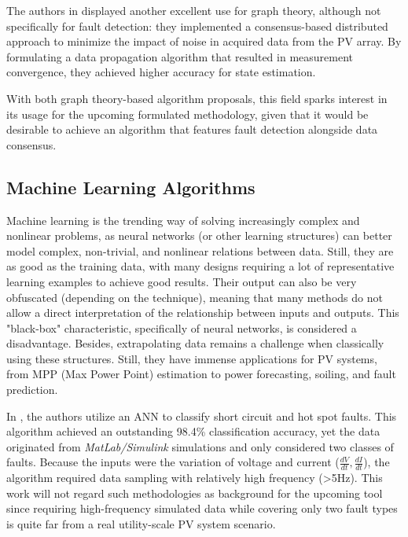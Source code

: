 The authors in \cite{Katoch2018} displayed another excellent use for graph theory, although not specifically for fault detection: they implemented a consensus-based distributed approach to minimize the impact of noise in acquired data from the PV array. By formulating a data propagation algorithm that resulted in measurement convergence, they achieved higher accuracy for state estimation.

With both graph theory-based algorithm proposals, this field sparks interest in its usage for the upcoming formulated methodology, given that it would be desirable to achieve an algorithm that features fault detection alongside data consensus.


\subsection{Machine Learning Algorithms} \label{subsec:machinelearning}

Machine learning is the trending way of solving increasingly complex and nonlinear problems, as neural networks (or other learning structures) can better model complex, non-trivial, and nonlinear relations between data. Still, they are as good as the training data, with many designs requiring a lot of representative learning examples to achieve good results. Their output can also be very obfuscated (depending on the technique), meaning that many methods do not allow a direct interpretation of the relationship between inputs and outputs. This "black-box" characteristic, specifically of neural networks, is considered a disadvantage. Besides, extrapolating data remains a challenge when classically using these structures. Still, they have immense applications for PV systems, from MPP (Max Power Point) estimation to power forecasting, soiling, and fault prediction.

In \cite{Kumari2022}, the authors utilize an ANN to classify short circuit and hot spot faults. This algorithm achieved an outstanding 98.4\% classification accuracy, yet the data originated from \textit{MatLab/Simulink} simulations and only considered two classes of faults. Because the inputs were the variation of voltage and current ($\frac{dV}{dt},\frac{dI}{dt}$), the algorithm required data sampling with relatively high frequency (>5Hz). This work will not regard such methodologies as background for the upcoming tool since requiring high-frequency simulated data while covering only two fault types is quite far from a real utility-scale PV system scenario.

